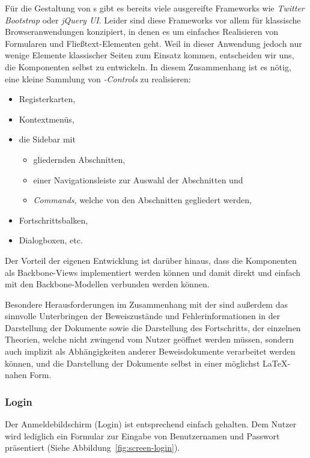 Für die Gestaltung von  s gibt es bereits viele ausgereifte Frameworks wie
\textit{Twitter Bootstrap} oder \textit{jQuery UI}. Leider sind diese Frameworks vor allem für
klassische Browseranwendungen konzipiert, in denen es um einfaches Realisieren von Formularen und
Fließtext-Elementen geht. Weil in dieser Anwendung jedoch nur wenige Elemente klassischer Seiten zum
Einsatz kommen, entscheiden wir uns, die  Komponenten selbst zu entwickeln. In diesem
Zusammenhang ist es nötig, eine kleine Sammlung von \textit{-Controls} zu realisieren:

\begin{itemize}
  \item Registerkarten,
  \item Kontextmenüs,
  \item die Sidebar mit
    \begin{itemize}      
      \item gliedernden Abschnitten,
      \item einer Navigationsleiste zur Auswahl der Abschnitten und
      \item \textit{Commands}, welche von den Abschnitten gegliedert werden,
    \end{itemize}
  \item Fortschrittsbalken,
  \item Dialogboxen, etc.
\end{itemize}

Der Vorteil der eigenen Entwicklung ist darüber hinaus, dass die Komponenten als Backbone-Views
implementiert werden können und damit direkt und einfach mit den Backbone-Modellen verbunden werden
können.

Besondere Herausforderungen im Zusammenhang mit der  sind außerdem das sinnvolle
Unterbringen der Beweiszustände und Fehlerinformationen in der Darstellung der Dokumente sowie die
Darstellung des Fortschritts, der einzelnen Theorien, welche nicht zwingend vom Nutzer geöffnet
werden müssen, sondern auch implizit als Abhängigkeiten anderer Beweisdokumente verarbeitet werden
können, und die Darstellung der Dokumente selbst in einer möglichst \LaTeX-nahen Form.

\subsubsection{Login}

Der Anmeldebildschirm (Login) ist entsprechend einfach gehalten. Dem Nutzer wird lediglich ein
Formular zur Eingabe von Benutzernamen und Passwort präsentiert (Siehe Abbildung 
\,\ref{fig:screen-login}).

